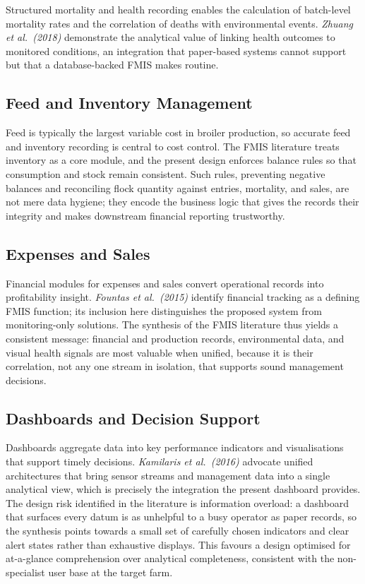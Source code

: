 \documentclass[12pt,a4paper]{report}
\begin{document}
Structured mortality and health recording enables the calculation of batch-level mortality rates and the correlation of deaths with environmental events. \textit{Zhuang et al.\ (2018)} demonstrate the analytical value of linking health outcomes to monitored conditions, an integration that paper-based systems cannot support but that a database-backed FMIS makes routine.

\subsection{Feed and Inventory Management}

Feed is typically the largest variable cost in broiler production, so accurate feed and inventory recording is central to cost control. The FMIS literature treats inventory as a core module, and the present design enforces balance rules so that consumption and stock remain consistent. Such rules, preventing negative balances and reconciling flock quantity against entries, mortality, and sales, are not mere data hygiene; they encode the business logic that gives the records their integrity and makes downstream financial reporting trustworthy.

\subsection{Expenses and Sales}

Financial modules for expenses and sales convert operational records into profitability insight. \textit{Fountas et al.\ (2015)} identify financial tracking as a defining FMIS function; its inclusion here distinguishes the proposed system from monitoring-only solutions. The synthesis of the FMIS literature thus yields a consistent message: financial and production records, environmental data, and visual health signals are most valuable when unified, because it is their correlation, not any one stream in isolation, that supports sound management decisions.

\subsection{Dashboards and Decision Support}

Dashboards aggregate data into key performance indicators and visualisations that support timely decisions. \textit{Kamilaris et al.\ (2016)} advocate unified architectures that bring sensor streams and management data into a single analytical view, which is precisely the integration the present dashboard provides. The design risk identified in the literature is information overload: a dashboard that surfaces every datum is as unhelpful to a busy operator as paper records, so the synthesis points towards a small set of carefully chosen indicators and clear alert states rather than exhaustive displays. This favours a design optimised for at-a-glance comprehension over analytical completeness, consistent with the non-specialist user base at the target farm.
\end{document}

